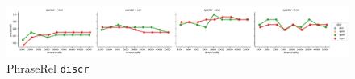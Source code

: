 \begin{figure}[b]
  \centering

  \includegraphics[width=1.1\textwidth]{supplement/figures/phraserel-interaction-discr}

  \caption{PhraseRel \texttt{discr}}
  \label{fig:phraserel-discr}
\end{figure}
